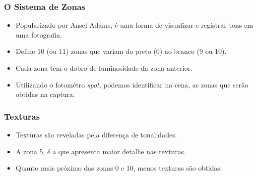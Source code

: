 \begin{frame}
    \frametitle{O Sistema de Zonas}
    \begin{itemize}
      \item Popularizado por Ansel Adams, é uma forma de visualizar e registrar
      tons em uma fotografia.
      \item Define 10 (ou 11) zonas que variam do preto (0) ao branco (9 ou 10).
      \item Cada zona tem o dobro de luminosidade da zona anterior.
      \item Utilizando o fotomêtro \textit{spot}, podemos identificar na cena, as
      zonas que serão obtidas na captura.
    \end{itemize}
\end{frame}



\begin{frame}
    \frametitle{Texturas}
    \begin{itemize}
      \item Texturas são reveladas pela diferença de tonalidades.
      \item A zona 5, é a que apresenta maior detalhe nas texturas.
      \item Quanto mais próximo das zonas 0 e 10, menos texturas são obtidas.
    \end{itemize}
\end{frame}

